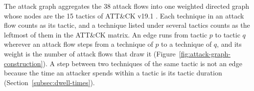 \documentclass{cshonours}
\begin{document}
The attack graph aggregates the 38 attack flows into one weighted directed
graph whose nodes are the 15 tactics of ATT\&CK v19.1
\citep{mitre2026attackv19}. Each technique in an attack flow counts as its
tactic, and a technique listed under several tactics counts as the
leftmost of them in the ATT\&CK matrix. An edge runs from tactic $p$ to
tactic $q$ wherever an attack flow steps from a technique of $p$ to a
technique of $q$, and its weight is the number of attack flows that draw
it (Figure~\ref{fig:attack-graph-construction}). A step between two
techniques of the same tactic is not an edge because the time an attacker spends
within a tactic is its tactic duration (Section~\ref{subsec:dwell-times}).
\end{document}
